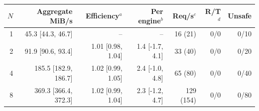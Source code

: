 
\begin{tabular}{@{}rrrrrrr@{}}
\toprule
$N$ & Aggregate MiB/s & Efficiency$^a$ & Per engine$^b$ & Req/s$^c$ & R/T$^d$ & Unsafe \\
\midrule
1 & 45.3 [44.3, 46.7] & -- & -- & 16 (21) & 0/0 & 0/10 \\
2 & 91.9 [90.6, 93.4] & 1.01 [0.98, 1.04] & 1.4 [-1.7, 4.1] & 33 (40) & 0/0 & 0/20 \\
4 & 185.5 [182.9, 186.7] & 1.02 [0.99, 1.05] & 2.4 [-1.0, 4.8] & 65 (80) & 0/0 & 0/40 \\
8 & 369.3 [366.4, 372.3] & 1.02 [0.99, 1.04] & 2.3 [-1.2, 4.7] & 129 (154) & 0/0 & 0/80 \\
\bottomrule
\end{tabular}

